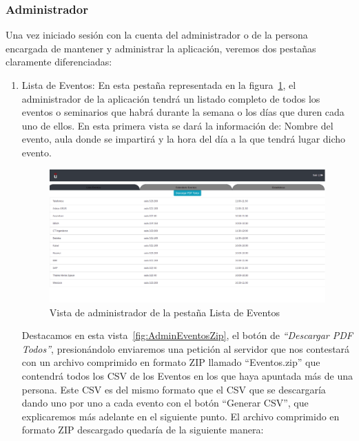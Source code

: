 \documentclass[a4paper, 12pt]{book}
\begin{document}
\subsubsection{Administrador}
	Una vez iniciado sesión con la cuenta del administrador o de la persona encargada de mantener y administrar la aplicación, veremos dos pestañas claramente diferenciadas:
\begin{enumerate}	
	\item Lista de Eventos: En esta pestaña representada en la figura~\ref{fig:adminListaEventos}, el administrador de la aplicación tendrá un listado completo de todos los eventos o seminarios que habrá durante la semana o los días que duren cada uno de ellos. En esta primera vista se dará la información de: Nombre del evento, aula donde se impartirá y la hora del día a la que tendrá lugar dicho evento.
	\begin{figure}[h!]
  	\centering
  	\includegraphics[width=16cm, keepaspectratio]{img/adminListaEventos.png}
  	\caption{Vista de administrador de la pestaña Lista de Eventos}\label{fig:adminListaEventos}
	\end{figure}
	
\vspace{6cm}


Destacamos en esta vista~\ref{fig:AdminEventosZip}, el botón de \textit{``Descargar PDF Todos''}, presionándolo enviaremos una petición al servidor que nos contestará con un archivo comprimido en formato ZIP llamado ``Eventos.zip'' que contendrá todos los CSV de los Eventos en los que haya apuntada más de una persona. Este CSV es del mismo formato que el CSV que se descargaría dando uno por uno a cada evento con el botón ``Generar CSV'', que explicaremos más adelante en el siguiente punto. El archivo comprimido en formato ZIP descargado quedaría de la siguiente manera:
	

\end{enumerate}
\end{document}
